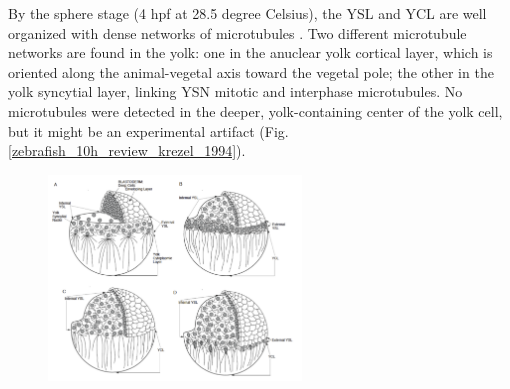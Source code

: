 By the sphere stage (4 hpf at 28.5 degree Celsius), the YSL and YCL are well organized with dense networks of microtubules \cite{Kimmel:1985uh}\cite{SolnicaKrezel:2002ty}. Two different microtubule networks are found in the yolk: one in the anuclear yolk cortical layer, which is oriented along the animal-vegetal axis toward the vegetal pole; the other in the yolk syncytial layer, linking YSN mitotic and interphase microtubules. No microtubules were detected in the deeper, yolk-containing center of the yolk cell, but it might be an experimental artifact \cite{SolnicaKrezel:1994wl} (Fig. \ref{zebrafish_10h_review_krezel_1994}).
\begin{figure}
\begin{center}
\includegraphics[width=0.6\textwidth]{../../images/zebrafish_10h_review/krezel_1994.png}
\end{center}

\end{figure}
